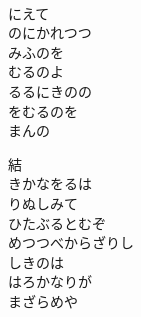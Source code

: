 \documentclass[10pt,b5j]{tarticle} %
\begin{document}
\begin{enumerate}
\begin{minipage}[c]{\blocksize}
        \vspace{\linespace}
        \item~\\
        にえて\\
        のにかれつつ\\
        みふのを\\
        むるのよ\\
        るるにきのの\\
        をむるのを\\
        まんの
        
    \end{minipage}
    \begin{minipage}[c]{\blocksize}
        
        \vspace{\linespace}
        \item[結]~\\
        きかなをるは\\
        りぬしみて\\
        ひたぶるとむぞ\\
        めつつべからざりし\\
        しきのは\\
        はろかなりが\\
        まざらめや
    
    \end{minipage}
\end{enumerate} %
\end{document}
